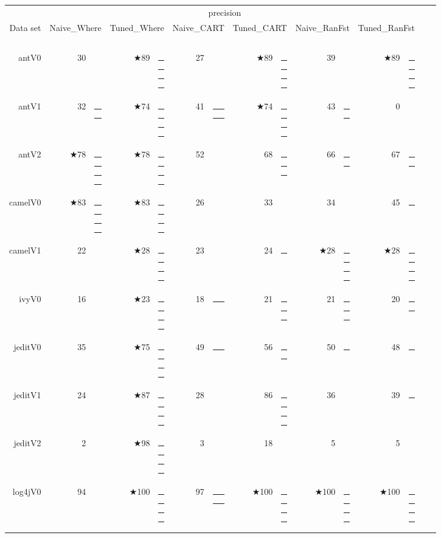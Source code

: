 \documentclass{acm_proc_article-sp}
\newcommand{\crule}[3][darkgray]{\textcolor{#1}{\rule{#2}{#3}}}
\newcommand{\rone}{\crule{1mm}{1.95mm}}
\newcommand{\rtwo}{\crule{1mm}{1.95mm}\hspace{0.3pt}\crule{1mm}{1.95mm}}
\newcommand{\rthree}{\crule{1mm}{1.95mm}\hspace{0.3pt}\crule{1mm}{1.95mm}\hspace{0.3pt}\crule{1mm}{1.95mm}}
\newcommand{\rfour}{\crule{1mm}{1.95mm}\hspace{0.3pt}\crule{1mm}{1.95mm}\hspace{0.3pt}\crule{1mm}{1.95mm}\hspace{0.3pt}\crule{1mm}{1.95mm}}
\begin{document}



\begin{figure*}
\renewcommand{\baselinestretch}{0.5} 
\scriptsize
\begin{minipage}{0.81\linewidth}
\begin{tabular}{r@{~}|r@{~}l@{~}|r@{~}l@{~}|r@{~}l|r@{~}@{~}l|r@{~}l@{~}|r@{~}l@{~}|r@{~}l}
  \multicolumn{1}{c|}{~}&\multicolumn{11}{c}{precision } \\
  Data set   &   \multicolumn{2}{c}{Naive\_Where}         &   \multicolumn{2}{c}{Tuned\_Where}         &   \multicolumn{2}{c}{Naive\_CART}         &   \multicolumn{2}{c}{Tuned\_CART}    &   \multicolumn{2}{c}{Naive\_RanFst}  &   \multicolumn{2}{c}{Tuned\_RanFst}\\\hline
\multicolumn{1}{c}{~}\\
antV0 & 30 &         & $\bigstar$89 & {\rfour} & 27 &         & $\bigstar$89 & {\rfour} & 39 &         & $\bigstar$89 & {\rfour}\\
antV1 & 32 & {\rtwo} & $\bigstar$74 & {\rfour} & 41 & {\rtwo} & $\bigstar$74 & {\rfour} & 43 & {\rtwo} & 0 &        \\
antV2 & $\bigstar$78 & {\rfour} & $\bigstar$78 & {\rfour} & 52 &         & 68 & {\rthree} & 66 & {\rtwo} & 67 & {\rtwo}\\
camelV0 & $\bigstar$83 & {\rfour} & $\bigstar$83 & {\rfour} & 26 &         & 33 &         & 34 &         & 45 & {\rone}\\
camelV1 & 22 &         & $\bigstar$28 & {\rfour} & 23 &         & 24 & {\rone} & $\bigstar$28 & {\rfour} & $\bigstar$28 & {\rfour}\\
ivyV0 & 16 &         & $\bigstar$23 & {\rfour} & 18 & {\rone} & 21 & {\rthree} & 21 & {\rthree} & 20 & {\rtwo}\\
jeditV0 & 35 &         & $\bigstar$75 & {\rfour} & 49 & {\rone} & 56 & {\rtwo} & 50 & {\rone} & 48 & {\rone}\\
jeditV1 & 24 &         & $\bigstar$87 & {\rfour} & 28 &         & 86 & {\rfour} & 36 &         & 39 & {\rone}\\
jeditV2 & 2 &         & $\bigstar$98 & {\rfour} & 3 &         & 18 &         & 5 &         & 5 &        \\
log4jV0 & 94 &         & $\bigstar$100 & {\rfour} & 97 & {\rtwo} & $\bigstar$100 & {\rfour} & $\bigstar$100 & {\rfour} & $\bigstar$100 & {\rfour}\\

\end{tabular}
\end{minipage}
\end{figure*}
\end{document}
